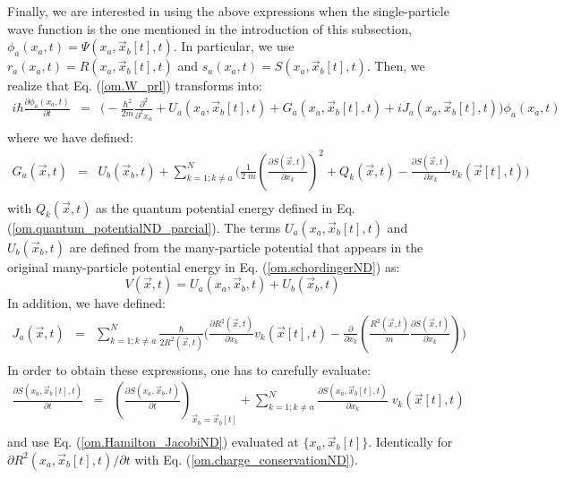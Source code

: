 \documentclass[nofootinbib, secnumarabic, amsmath, nobibnotes,11pt,aps,pra, floatfix]{revtex4-1}
\newcommand{\eref}[1]{Eq. (\ref{#1})}
\begin{document}
Finally, we are interested in using the above expressions when the single-particle wave function is the one mentioned in the introduction of this subsection, $\phi_a(x_a,t) = \Psi(x_a,\vec x_b[t],t)$. In particular, we use $r_a(x_a,t) = R(x_{a},\vec x_{b}[t],t)$ and $s_a(x_a,t) = S(x_{a},\vec x_{b}[t],t)$. Then, we realize that \eref{om.W_prl} transforms into:
\begin{eqnarray}
\label{om.pseudoscho_prl}
i\hbar\frac{\partial \phi_{a}(x_{a},t)}{\partial t} &=& \bigg( -\frac
{\hbar^2} {2m}\frac {\partial^2}{\partial^2 {x_a}} + U_{a}(x_{a},\vec
x_{b}[t],t)+ G_{a}(x_{a},\vec x_{b}[t],t) + i J_{a}(x_{a},\vec x_{b}[t],t) \bigg) \phi_{a}(x_{a},t)\nonumber\\
\end{eqnarray}
where we have defined:
\begin{eqnarray}
\label{om.G_prl}
G_{a}(\vec x,t) &=& U_b(\vec x_{b},t) + \sum_{k = 1;k\neq a}^{N} \Bigg( \frac {1} {2 \; m} \left (\frac {\partial S(\vec x,t)} {\partial x_k} \right)^2+ Q_k(\vec x,t) - \frac {\partial S(\vec x,t)} {\partial x_k} v_k(\vec x[t],t) \Bigg)\nonumber\\
\end{eqnarray}
with $Q_k(\vec x,t)$ as the quantum potential energy defined in \eref{om.quantum_potentialND_parcial}. The terms \textit{$U_{a}(x_{a},\vec x_{b}[t],t)$} and \textit{$U_b(\vec x_{b},t)$} are defined from the many-particle potential that appears in the original many-particle potential energy in \eref{om.schordingerND} as:
\begin{equation}
\label{om.U_prl}
V(\vec x,t) = U_{a}(x_{a},\vec x_{b},t) + U_b(\vec x_{b},t)
\end{equation}
In addition, we have defined:
\begin{eqnarray}
\label{om.J_prl}
J_{a}(\vec x,t) &=& \sum_{k = 1;k\neq a}^{N} \frac {\hbar} {2R^2(\vec
x,t)} \Bigg( \frac {\partial R^2(\vec x,t)} {\partial x_k} v_k(\vec
x[t],t) - \frac {\partial} {\partial x_k} \left( \frac {R^2(\vec x,t)} {m} \frac {\partial S(\vec x,t)} {\partial x_k} \right) \Bigg)\nonumber\\
\end{eqnarray}
In order to obtain these expressions, one has to carefully evaluate:
\begin{eqnarray}
\label{om.prlpas}
\frac {\partial S(x_a,\vec x_b[t],t)} {\partial t} &=& \left( \frac
{\partial S(x_a,\vec x_b,t)} {\partial t}\right)_{\vec x_b = \vec
x_b[t]}+ \sum_{k = 1; k \neq a}^{N}\frac {\partial S(x_a,\vec x_b[t],t)}{\partial x_k} \; v_k(\vec x[t],t)\nonumber\\
\end{eqnarray}
and use \eref{om.Hamilton_JacobiND} evaluated at $\{x_a,\vec x_b[t]\}$. Identically for  $\partial R^2(x_a,\vec x_b[t],t)/\partial t$ with \eref{om.charge_conservationND}.
\end{document}
